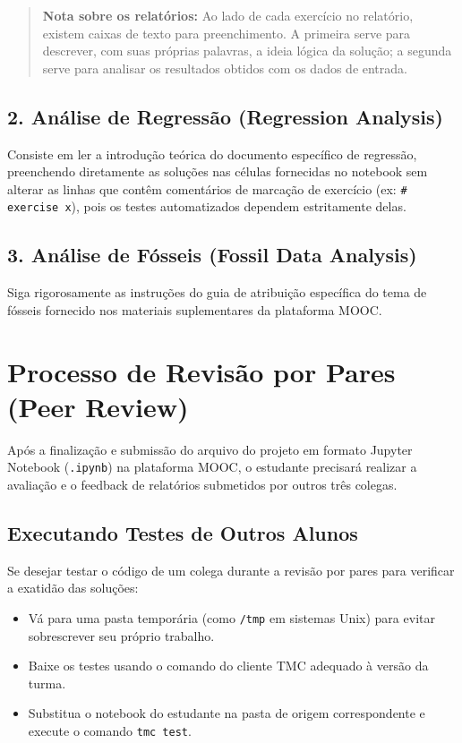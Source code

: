 \documentclass[11pt,a4paper]{article}
\begin{document}
\begin{quote}
\textbf{Nota sobre os relatórios:} Ao lado de cada exercício no relatório, existem caixas de texto para preenchimento. A primeira serve para descrever, com suas próprias palavras, a ideia lógica da solução; a segunda serve para analisar os resultados obtidos com os dados de entrada.
\end{quote}

\subsection{2. Análise de Regressão (Regression Analysis)}
Consiste em ler a introdução teórica do documento específico de regressão, preenchendo diretamente as soluções nas células fornecidas no notebook sem alterar as linhas que contêm comentários de marcação de exercício (ex: \texttt{\# exercise x}), pois os testes automatizados dependem estritamente delas.

\subsection{3. Análise de Fósseis (Fossil Data Analysis)}
Siga rigorosamente as instruções do guia de atribuição específica do tema de fósseis fornecido nos materiais suplementares da plataforma MOOC.

\section{Processo de Revisão por Pares (Peer Review)}
Após a finalização e submissão do arquivo do projeto em formato Jupyter Notebook (\texttt{.ipynb}) na plataforma MOOC, o estudante precisará realizar a avaliação e o feedback de relatórios submetidos por outros três colegas.

\subsection{Executando Testes de Outros Alunos}
Se desejar testar o código de um colega durante a revisão por pares para verificar a exatidão das soluções:
\begin{itemize}
    \item Vá para uma pasta temporária (como \texttt{/tmp} em sistemas Unix) para evitar sobrescrever seu próprio trabalho.
    \item Baixe os testes usando o comando do cliente TMC adequado à versão da turma.
    \item Substitua o notebook do estudante na pasta de origem correspondente e execute o comando \texttt{tmc test}.
\end{itemize}
\end{document}
